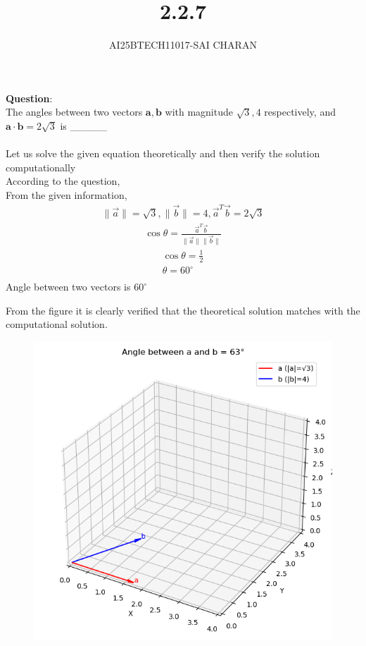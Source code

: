 \documentclass[journal]{IEEEtran}
\begin{document}

\vspace{3cm}

\title{2.2.7}
\author{AI25BTECH11017-SAI CHARAN}
 \maketitle
{\let\newpage\relax\maketitle}
\renewcommand{\thefigure}{\theenumi}
\renewcommand{\thetable}{\theenumi}
\setlength{\intextsep}{10pt} %
\renewcommand{\thetable}{\theenumi}
\textbf{Question}:\\
The angles between two vectors $\mathbf{a}, \mathbf{b}$ with magnitude $\sqrt{3}, 4$ respectively, and $\mathbf{a} \cdot \mathbf{b} = 2\sqrt{3}$ is \_\_\_\_\_
\\ 
\solution \\
Let us solve the given equation theoretically and then verify the solution computationally \\
According to the question, \\
From the given information,
\begin{align}
   \|\vec{a}\|=\sqrt{3},\|\vec{b}\|=4,\vec{a}^T\vec{b}=2\sqrt{3}
   \end{align}
   \begin{align}
 \cos\theta=\frac{\vec{a}^T\vec{b}}{\|\vec{a}\|\|\vec{b}\|}
\end{align}
\begin{align}
  \cos\theta=\frac{1}{2}\\
  \theta=60^{\circ}\\
\end{align}
Angle between two vectors is $60^{\circ}$

\vspace*{0.25cm}

From the figure it is clearly verified that the theoretical solution matches with the computational solution.\\
\begin{figure}[h!]
    \centering
    \includegraphics[height=0.3\textheight, keepaspectratio]{figs/fig3.png}
    \label{figure_1}
\end{figure}
 
\end{document}
